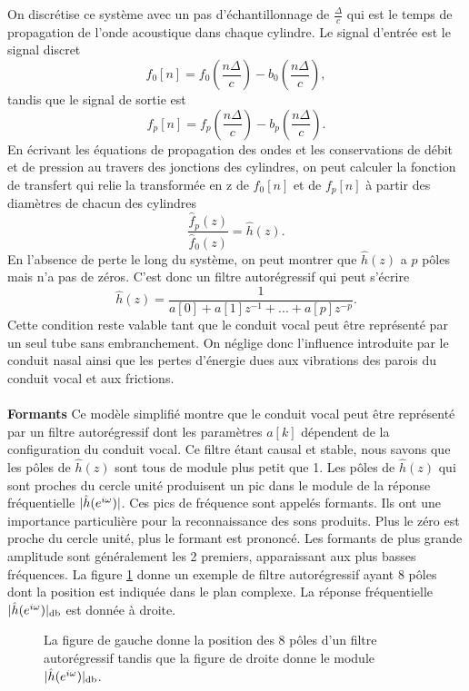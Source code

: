 On discr\'etise ce syst\`eme avec un pas d'\'echantillonnage de
$\frac \Delta c$ qui est le temps de propagation de l'onde
acoustique dans chaque
cylindre. Le signal d'entr\'ee est le signal discret
\[
f_0 [n] = f_0 (\frac {n \Delta} c ) - b_0 (\frac {n \Delta} c ) ,
\]
tandis que le signal de sortie est
\[
f_p [n] = f_p (\frac {n \Delta} c ) - b_p (\frac {n \Delta} c ) .
\]
En \'ecrivant les \'equations de propagation des ondes et
les conservations de d\'ebit et de pression au travers des
jonctions des cylindres, on peut calculer la fonction de
transfert qui relie la transform\'ee en z de $f_0 [n]$ et de
$f_p [n]$ \`a partir des diam\`etres de chacun des cylindres
\[
\frac {\hat f_p (z)} {\hat f_0 (z)} = \hat h(z) .
\]
En l'absence de perte le long du syst\`eme, on peut montrer que
$\hat h(z)$ a $p$ p\^oles mais n'a pas de z\'eros.
C'est donc un filtre autor\'egressif qui peut s'\'ecrire
\[
\hat h (z) = \frac 1 {a[0] + a[1] z^{-1}+ ... + a[p] z^{-p}} .
\]
Cette condition reste valable tant que le conduit vocal peut
\^etre repr\'esent\'e par un seul tube sans embranchement. On n\'eglige
donc l'influence introduite par le conduit nasal ainsi que
les pertes d'\'energie dues aux vibrations
des parois du conduit vocal et aux frictions.
\\
\\
{\bf Formants}
Ce mod\`ele simplifi\'e montre que le conduit vocal peut \^etre repr\'esent\'e
par un filtre autor\'egressif dont les param\`etres $a[k]$ d\'ependent
de la configuration du conduit vocal.
Ce filtre \' etant causal et stable, nous savons que les p\^oles de
$\hat h (z)$ sont tous de module plus petit que 1.
Les p\^oles de $\hat h(z)$ qui sont proches du cercle unit\'e
produisent un pic dans le module de la r\'eponse fr\'equentielle
$|\hat h ({e ^{i \omega}})|$.
Ces pics de fr\'equence sont appel\'es formants. Ils ont une
importance particuli\`ere pour la reconnaissance des sons produits.
Plus le z\'ero est proche du cercle unit\'e, plus le formant est
prononc\'e. Les formants de plus grande amplitude
sont g\'en\'eralement les
2 premiers, apparaissant aux plus basses fr\'equences.
La figure \ref{autoreg}
donne un exemple de filtre autor\'egressif ayant 8 p\^oles dont
la position est indiqu\'ee dans
le plan complexe. La r\'eponse fr\'equentielle
$|\hat h ({e ^{i \omega}})|_{\rm db}$ est donn\'ee \`a droite.

\begin{figure}
\vspace{8cm}
\caption{La figure de gauche donne la position des 8 p\^oles
d'un filtre autor\'egressif tandis que la figure de droite
donne le module $|\hat h ({e ^{i \omega}})|_{\rm db}$.}
\label{autoreg}
\end{figure}



